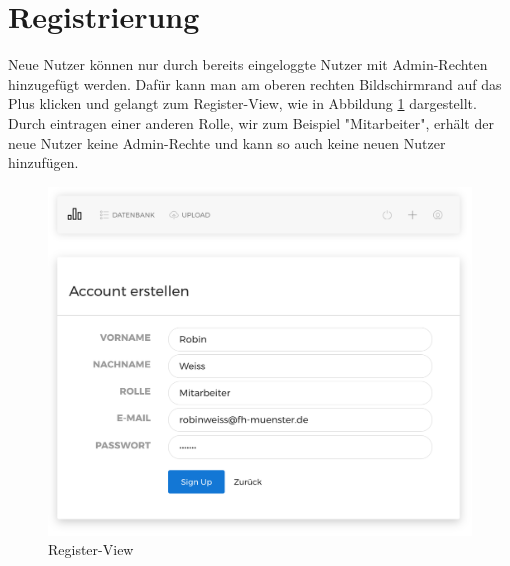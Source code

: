 \section{Registrierung}

Neue Nutzer können nur durch bereits eingeloggte Nutzer mit Admin-Rechten hinzugefügt werden. Dafür kann man am oberen rechten Bildschirmrand auf das Plus klicken und gelangt zum Register-View, wie in Abbildung \ref{fig:register} dargestellt. Durch eintragen einer anderen Rolle, wir zum Beispiel "Mitarbeiter", erhält der neue Nutzer keine Admin-Rechte und kann so auch keine neuen Nutzer hinzufügen.

\begin{figure}
\centering
\includegraphics[width=\textwidth]{Figures/register}
\caption{Register-View}
\label{fig:register}
\end{figure}

